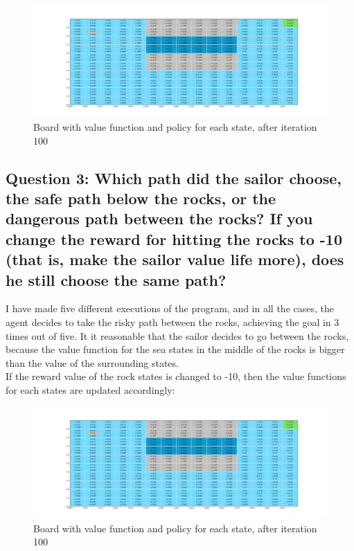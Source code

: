 \documentclass[12pt]{article}
\begin{document}
\begin{figure}[H]
    \centering
    \includegraphics[scale=0.25]{exercise-2/report/img/final-board-with-policy.png}
    \caption{Board with value function and policy for each state, after iteration 100}
    \label{fig:pol-final-board}
\end{figure}

\subsection{Question 3: Which path did the sailor choose, the safe path below the rocks, or the dangerous path between the rocks? If you change the reward for hitting the rocks to -10 (that is, make the sailor value life more), does he still choose the same path?}

I have made five different executions of the program, and in all the cases, the agent decides to take the risky path between the rocks, achieving the goal in 3 times out of five. It it reasonable that the sailor decides to go between the rocks, because the value function for the sea states in the middle of the rocks is bigger than the value of the surrounding states. \\

If the reward value of the rock states is changed to -10, then the value functions for each states are updated accordingly:

\begin{figure}[H]
    \centering
    \includegraphics[scale=0.25]{exercise-2/report/img/final-board-with-policy.png}
    \caption{Board with value function and policy for each state, after iteration 100}
    \label{fig:pol-final-board}
\end{figure}


\end{document}
